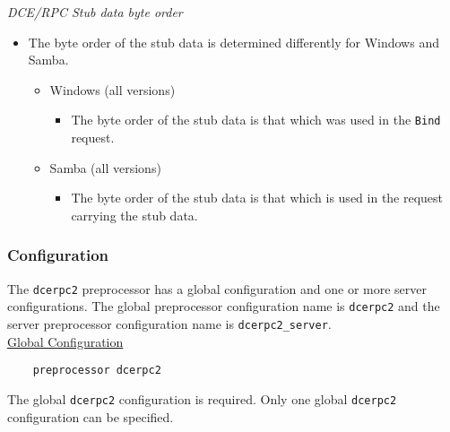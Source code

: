\documentclass[english]{report}
\begin{document}
\textit{DCE/RPC Stub data byte order}
\begin{itemize}

\item[] The byte order of the stub data is determined differently for Windows
and Samba.

\begin{itemize}
\item[] Windows (all versions)
\begin{itemize}

\item[] The byte order of the stub data is that which was used in the
\texttt{Bind} request.

\end{itemize}

\item[] Samba (all versions)

\begin{itemize}

\item[] The byte order of the stub data is that which is used in the request
carrying the stub data.

\end{itemize}
\end{itemize}
\end{itemize}

\subsubsection{Configuration}

The \texttt{dcerpc2} preprocessor has a global configuration and one or more
server configurations.  The global preprocessor configuration name is
\texttt{dcerpc2} and the server preprocessor configuration name is
\texttt{dcerpc2\_server}.\\

\underline{Global Configuration}

\begin{verbatim}
    preprocessor dcerpc2
\end{verbatim}

The global \texttt{dcerpc2} configuration is required.  Only one global
\texttt{dcerpc2} configuration can be specified.\\
\end{document}
